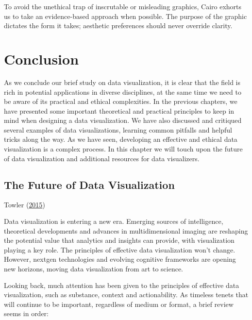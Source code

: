 \documentclass[]{book}
\begin{document}
To avoid the unethical trap of inscrutable or misleading graphics, Cairo exhorts us to take an evidence-based approach when possible. The purpose of the graphic dictates the form it takes; aesthetic preferences should never override clarity.

\hypertarget{conclusion}{%
\chapter{Conclusion}\label{conclusion}}

As we conclude our brief study on data visualization, it is clear that the field is rich in potential applications in diverse disciplines, at the same time we need to be aware of its practical and ethical complexities. In the previous chapters, we have presented some important theoretical and practical principles to keep in mind when designing a data visualization. We have also discussed and critiqued several examples of data visualizations, learning common pitfalls and helpful tricks along the way. As we have seen, developing an effective and ethical data visualization is a complex process. In this chapter we will touch upon the future of data visualization and additional resources for data visualizers.

\hypertarget{the-future-of-data-visualization}{%
\section{The Future of Data Visualization}\label{the-future-of-data-visualization}}

Towler (\protect\hyperlink{ref-future_viz}{2015})

Data visualization is entering a new era. Emerging sources of intelligence, theoretical developments and advances in multidimensional imaging are reshaping the potential value that analytics and insights can provide, with visualization playing a key role. The principles of effective data visualization won't change. However, nextgen technologies and evolving cognitive frameworks are opening new horizons, moving data visualization from art to science.

Looking back, much attention has been given to the principles of effective data visualization, such as substance, context and actionability. As timeless tenets that will continue to be important, regardless of medium or format, a brief review seems in order:
\end{document}
